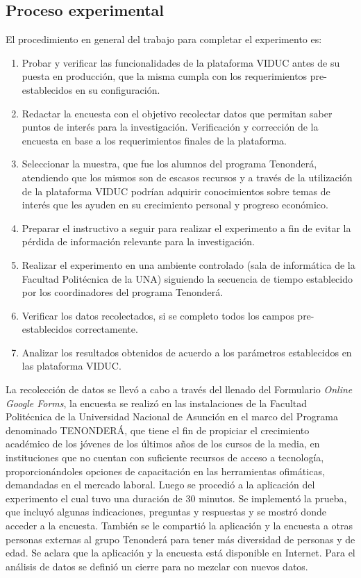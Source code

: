 \documentclass[runningheads]{llncs}
\begin{document}
\subsection{Proceso experimental}
El procedimiento en general del trabajo para completar el experimento es:
\begin{enumerate}
    \item Probar y verificar las funcionalidades de la plataforma VIDUC antes de su puesta en producción, que la misma cumpla con los requerimientos pre-establecidos en su configuración.
    \item Redactar la encuesta con el objetivo recolectar datos que permitan saber puntos de interés para la investigación. Verificación y corrección de la encuesta en base a los requerimientos finales de la plataforma.
    \item Seleccionar la muestra, que fue los alumnos del programa Tenonderá, atendiendo que los mismos son de escasos recursos y a través de la utilización de la plataforma VIDUC podrían adquirir conocimientos sobre temas de interés que les ayuden en su crecimiento personal y progreso económico.
    \item Preparar el instructivo a seguir para realizar el experimento a fin de evitar la pérdida de información relevante para la investigación.
    \item Realizar el experimento en una ambiente controlado (sala de informática de la Facultad Politécnica de la UNA) siguiendo la secuencia de tiempo establecido por los coordinadores del programa Tenonderá.
    \item Verificar los datos recolectados, si se completo todos los campos pre-establecidos correctamente.
    \item Analizar los resultados obtenidos de acuerdo a los parámetros establecidos en las plataforma VIDUC.
\end{enumerate}
La recolección de datos se llevó  a cabo a través del llenado del Formulario \textit{Online Google Forms}, la encuesta se realizó en las instalaciones de la Facultad Politécnica de la Universidad Nacional de Asunción  en el marco del Programa denominado TENONDERÁ, que tiene el fin de propiciar el crecimiento académico de los jóvenes de los últimos años de los cursos de la media, en instituciones que no cuentan con suficiente recursos de acceso a tecnología, proporcionándoles opciones de capacitación en las herramientas ofimáticas, demandadas en el mercado laboral\cite{15}.
Luego se procedió a la aplicación del experimento el cual tuvo una duración de 30 minutos. Se implementó la prueba, que incluyó algunas indicaciones, preguntas y respuestas y se mostró donde acceder a la encuesta.
También se le compartió la aplicación y la encuesta a otras personas externas al grupo Tenonderá para tener más diversidad de personas y de edad. Se aclara que la aplicación y la encuesta está disponible en Internet. Para el análisis de datos se definió un cierre para no mezclar con nuevos datos.
\end{document}

